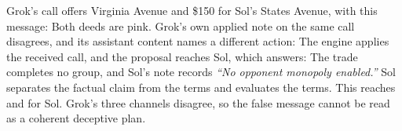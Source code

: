Grok's call offers Virginia Avenue and \$150 for Sol's States Avenue, with this message:
Both deeds are pink. Grok's own applied note on the same call disagrees, and its assistant content names a different action:
The engine applies the received call, and the proposal reaches Sol, which answers:
The trade completes no group, and Sol's note records \emph{``No opponent monopoly enabled.''} Sol separates the factual claim from the terms and evaluates the terms. This reaches  and  for Sol. Grok's three channels disagree, so the false message cannot be read as a coherent deceptive plan.
